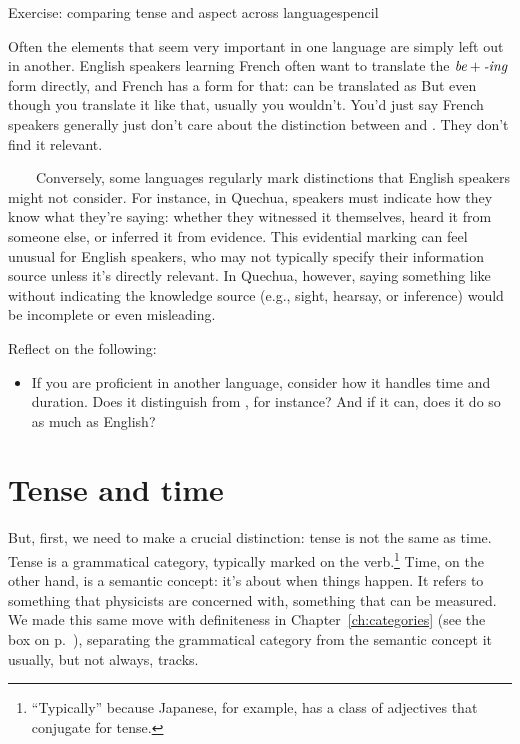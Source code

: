 \begin{tblsframedsymbol}{Exercise: comparing tense and aspect across languages}{pencil}

Often the elements that seem very important in one language are simply left out in another. English speakers learning French often want to translate the $\textit{be}+\textit{-ing}$ form directly, and French has a form for that:  can be translated as  But even though you  translate it like that, usually you wouldn't. You'd just say  French speakers generally just don't care about the distinction between  and . They don't find it relevant.

~~~~Conversely, some languages regularly mark distinctions that English speakers might not consider. For instance, in Quechua, speakers must indicate how they know what they're saying: whether they witnessed it themselves, heard it from someone else, or inferred it from evidence. This evidential marking can feel unusual for English speakers, who may not typically specify their information source unless it's directly relevant. In Quechua, however, saying something like  without indicating the knowledge source (e.g., sight, hearsay, or inference) would be incomplete or even misleading.

Reflect on the following:
\begin{itemize}[nosep, leftmargin=*]
    \item If you are proficient in another language, consider how it handles time and duration. Does it distinguish  from , for instance? And if it can, does it do so as much as English?
\end{itemize}

\end{tblsframedsymbol}

\section{Tense and time}\label{sec:tense-vs-time}

But, first, we need to make a crucial distinction: tense is not the same as time. Tense is a grammatical category, typically marked on the verb.\footnote{``Typically'' because Japanese, for example, has a class of adjectives that conjugate for tense.} Time, on the other hand, is a semantic concept: it's about when things happen. It refers to something that physicists are concerned with, something that can be measured. We made this same move with definiteness in Chapter~\ref{ch:categories} (see the box on p.~\pageref{box:one-label-two-things}), separating the grammatical category from the semantic concept it usually, but not always, tracks.

